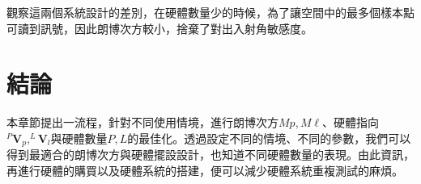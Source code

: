    觀察這兩個系統設計的差別，在硬體數量少的時候，為了讓空間中的最多個樣本點可讀到訊號，因此朗博次方較小，捨棄了對出入射角敏感度。



\section{結論}

本章節提出一流程，針對不同使用情境，進行朗博次方$Mp,M\ell$、硬體指向$^{P}\boldsymbol{V}_p,^{L}\boldsymbol{V}_l$與硬體數量$P,L$的最佳化。透過設定不同的情境、不同的參數，我們可以得到最適合的朗博次方與硬體擺設設計，也知道不同硬體數量的表現。由此資訊，再進行硬體的購買以及硬體系統的搭建，便可以減少硬體系統重複測試的麻煩。

















